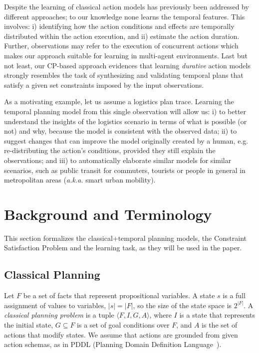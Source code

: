 \documentclass[runningheads]{llncs}
\newcommand{\tup}[1]{{\langle #1 \rangle}}
\begin{document}
Despite the learning of classical action models has previously been addressed by different approaches; to our knowledge none learns the temporal features. This involves: i) identifying how the action conditions and effects are temporally distributed within the action execution, and ii) estimate the action duration. Further, observations may refer to the execution of concurrent actions which makes our approach suitable for learning in multi-agent environments. Last but not least, our CP-based approach evidences that learning {\em durative} action models strongly resembles the task of synthesizing and validating temporal plans that satisfy a given set constraints imposed by the input observations. 

As a motivating example, let us assume a logistics plan trace. Learning the temporal planning model from this single observation will allow us: i) to better understand the insights of the logistics scenario in terms of what is possible (or not) and why, because the model is consistent with the observed data; ii) to suggest changes that can improve the model originally created by a human, e.g. re-distributing the action's conditions, provided they still explain the observations; and iii) to automatically elaborate similar models for similar scenarios, such as public transit for commuters, tourists or people in general in metropolitan areas (\emph{a.k.a.} smart urban mobility).



\section{Background and Terminology}
\label{sec:background}

This section formalizes the classical+temporal planning models, the Constraint Satisfaction Problem and the learning task, as they will be used in the paper.

\subsection{Classical Planning}
\label{sec:classicalplanning}
Let $F$ be a set of facts that represent propositional variables.
A state $s$ is a full assignment of values to variables, $|s|=|F|$, so the size of the state space is $2^{|F|}$.
A {\em classical planning problem} is a tuple $\tup{F,I,G,A}$, where $I$ is a state that represents the initial state, $G \subseteq F$ is a set of goal conditions over $F$, and $A$ is the set of actions that modify states. We assume that actions are grounded from given action schemas, as in PDDL (Planning Domain Definition Language~\cite{fox2003pddl2,Ghallab98,ghallab2004automated}).
\end{document}
